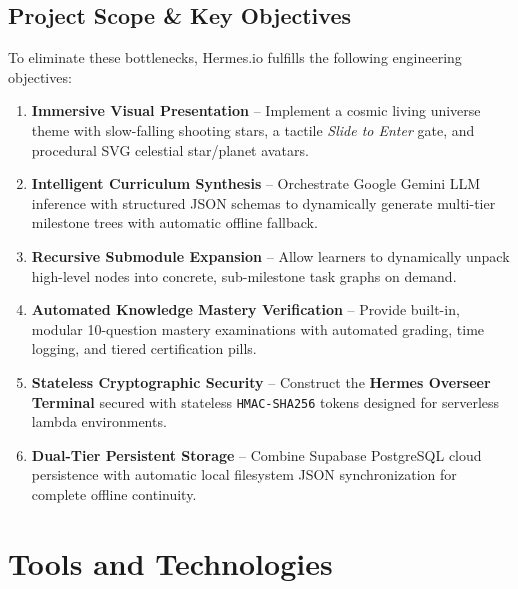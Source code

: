 \documentclass[12pt,a4paper]{article}
\begin{document}
\subsection{Project Scope \& Key Objectives}
To eliminate these bottlenecks, Hermes.io fulfills the following engineering objectives:
\begin{enumerate}[leftmargin=1.5em, itemsep=4pt]
    \item \textbf{Immersive Visual Presentation} -- Implement a cosmic living universe theme with slow-falling shooting stars, a tactile \textit{Slide to Enter} gate, and procedural SVG celestial star/planet avatars.
    \item \textbf{Intelligent Curriculum Synthesis} -- Orchestrate Google Gemini LLM inference with structured JSON schemas to dynamically generate multi-tier milestone trees with automatic offline fallback.
    \item \textbf{Recursive Submodule Expansion} -- Allow learners to dynamically unpack high-level nodes into concrete, sub-milestone task graphs on demand.
    \item \textbf{Automated Knowledge Mastery Verification} -- Provide built-in, modular 10-question mastery examinations with automated grading, time logging, and tiered certification pills.
    \item \textbf{Stateless Cryptographic Security} -- Construct the \textbf{Hermes Overseer Terminal} secured with stateless \texttt{HMAC-SHA256} tokens designed for serverless lambda environments.
    \item \textbf{Dual-Tier Persistent Storage} -- Combine Supabase PostgreSQL cloud persistence with automatic local filesystem JSON synchronization for complete offline continuity.
\end{enumerate}

\newpage

\section{Tools and Technologies}
\end{document}
